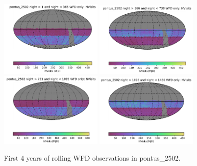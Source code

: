 \documentclass[DM,lsstdraft,authoryear,toc]{lsstdoc}
\begin{document}
\begin{figure}[ht]
\centering
\includegraphics[width=0.45\textwidth]{figures/pontus_2502_NVisits_night_gt_1_and_night_lt_365_WFD_only_HEAL_SkyMap.pdf}
\includegraphics[width=0.45\textwidth]{figures/pontus_2502_NVisits_night_gt_366_and_night_lt_730_WFD_only_HEAL_SkyMap.pdf}\\
\includegraphics[width=0.45\textwidth]{figures/pontus_2502_NVisits_night_gt_731_and_night_lt_1095_WFD_only_HEAL_SkyMap.pdf}
\includegraphics[width=0.45\textwidth]{figures/pontus_2502_NVisits_night_gt_1096_and_night_lt_1460_WFD_only_HEAL_SkyMap.pdf}
\caption{First 4 years of rolling WFD observations in  pontus\_2502.}
\label{fig:rolling_nvis-2502}
\end{figure}
\end{document}
